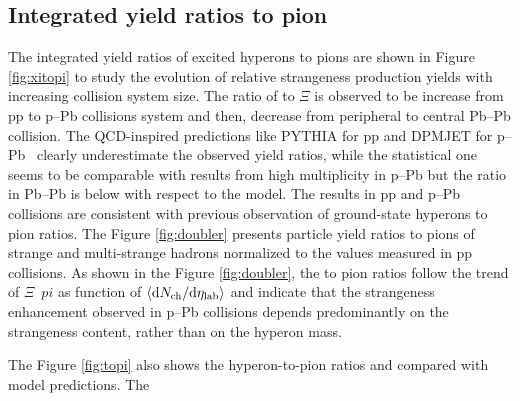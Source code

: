 \subsection{Integrated yield ratios to pion}
The integrated yield ratios of excited hyperons to pions are shown in Figure \ref{fig:xitopi} to study the evolution of relative strangeness production yields with increasing collision system size. The ratio of \xis to $\Xi$ is observed to be increase from pp to p--Pb collisions system and then, decrease from peripheral to central Pb--Pb collision. The QCD-inspired predictions like PYTHIA for pp \cite{cite:pythia8} and DPMJET for p--Pb~\cite{cite:DPMJET} clearly underestimate the observed yield ratios, while the statistical one seems to be comparable with results from high multiplicity in p--Pb but the ratio in Pb--Pb is below with respect to the model. 
The results in pp and p--Pb collisions are consistent with previous observation of ground-state hyperons to pion ratios. The Figure \ref{fig:doubler} presents particle yield ratios to pions of strange and multi-strange hadrons normalized to the values measured in pp collisions. As shown in the Figure \ref{fig:doubler}, the \xis to pion ratios follow the trend of $\Xi$\ $pi$ as function  of $\meandNdeta$ and indicate that the strangeness enhancement observed in p--Pb collisions depends predominantly on the strangeness content, rather than on the hyperon mass. 

The Figure \ref{fig:topi} also shows the hyperon-to-pion ratios and compared with model predictions. The 


